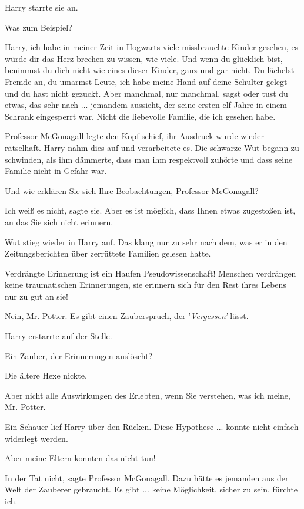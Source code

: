 Harry starrte sie an.

\glqq{}Was zum Beispiel?\grqq{}

\glqq{}Harry, ich habe in meiner Zeit in Hogwarts viele missbrauchte Kinder
gesehen, es würde dir das Herz brechen zu wissen, wie viele. Und wenn du
glücklich bist, benimmst du dich nicht wie eines dieser Kinder, ganz und gar
nicht. Du lächelst Fremde an, du umarmst Leute, ich habe meine Hand auf deine
Schulter gelegt und du hast nicht gezuckt. Aber manchmal, nur manchmal, sagst
oder tust du etwas, das sehr nach ... jemandem aussieht, der seine ersten elf
Jahre in einem Schrank eingesperrt war. Nicht die liebevolle Familie, die ich
gesehen habe.\grqq{}

Professor McGonagall legte den Kopf schief, ihr Ausdruck wurde wieder
rätselhaft. Harry nahm dies auf und verarbeitete es. Die schwarze Wut begann zu
schwinden, als ihm dämmerte, dass man ihm respektvoll zuhörte und dass seine
Familie nicht in Gefahr war.

\glqq{}Und wie erklären Sie sich Ihre Beobachtungen, Professor
McGonagall?\grqq{}

\glqq{}Ich weiß es nicht\grqq{}, sagte sie. \glqq{}Aber es ist möglich, dass
Ihnen etwas zugestoßen ist, an das Sie sich nicht erinnern.\grqq{}

Wut stieg wieder in Harry auf. Das klang nur zu sehr nach dem, was er in den
Zeitungsberichten über zerrüttete Familien gelesen hatte.

\glqq{}Verdrängte Erinnerung ist ein Haufen Pseudowissenschaft! Menschen
verdrängen keine traumatischen Erinnerungen, sie erinnern sich für den Rest
ihres Lebens nur zu gut an sie!\grqq{}

\glqq{}Nein, Mr. Potter. Es gibt einen Zauberspruch, der '\emph{Vergessen'}
lässt.\grqq{}

Harry erstarrte auf der Stelle.

\glqq{}Ein Zauber, der Erinnerungen auslöscht?\grqq{}

Die ältere Hexe nickte.

\glqq{}Aber nicht alle Auswirkungen des Erlebten, wenn Sie verstehen, was ich
meine, Mr. Potter.\grqq{}

Ein Schauer lief Harry über den Rücken. Diese Hypothese ... konnte nicht einfach
widerlegt werden.

\glqq{}Aber meine Eltern konnten das nicht tun!\grqq{}

\glqq{}In der Tat nicht\grqq{}, sagte Professor McGonagall. \glqq{}Dazu hätte es
jemanden aus der Welt der Zauberer gebraucht. Es gibt ... keine Möglichkeit,
sicher zu sein, fürchte ich.\grqq{}


